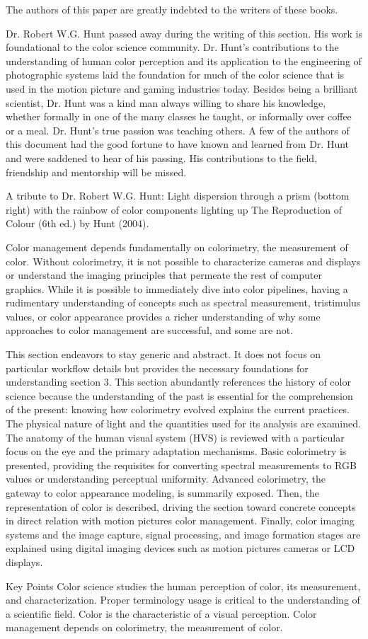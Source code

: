 The authors of this paper are greatly indebted to the writers of these books.

Dr. Robert W.G. Hunt passed away during the writing of this section. His work is foundational to the color science community. Dr. Hunt’s contributions to the understanding of human color perception and its application to the engineering of photographic systems laid the foundation for much of the color science that is used in the motion picture and gaming industries today. Besides being a brilliant scientist, Dr. Hunt was a kind man always willing to share his knowledge, whether formally in one of the many classes he taught, or informally over coffee or a meal. Dr. Hunt’s true passion was teaching others. A few of the authors of this document had the good fortune to have known and learned from Dr. Hunt and were saddened to hear of his passing. His contributions to the field, friendship and mentorship will be missed.

A tribute to Dr. Robert W.G. Hunt: Light dispersion through a prism (bottom right) with the rainbow of color components lighting up The Reproduction of Colour (6th ed.) by Hunt (2004).

Color management depends fundamentally on colorimetry, the measurement of color. Without colorimetry, it is not possible to characterize cameras and displays or understand the imaging principles that permeate the rest of computer graphics. While it is possible to immediately dive into color pipelines, having a rudimentary understanding of concepts such as spectral measurement, tristimulus values, or color appearance provides a richer understanding of why some approaches to color management are successful, and some are not.

This section endeavors to stay generic and abstract. It does not focus on particular workflow details but provides the necessary foundations for understanding section 3. This section abundantly references the history of color science because the understanding of the past is essential for the comprehension of the present: knowing how colorimetry evolved explains the current practices. The physical nature of light and the quantities used for its analysis are examined. The anatomy of the human visual system (HVS) is reviewed with a particular focus on the eye and the primary adaptation mechanisms. Basic colorimetry is presented, providing the requisites for converting spectral measurements to RGB values or understanding perceptual uniformity. Advanced colorimetry, the gateway to color appearance modeling, is summarily exposed. Then, the representation of color is described, driving the section toward concrete concepts in direct relation with motion pictures color management. Finally, color imaging systems and the image capture, signal processing, and image formation stages are explained using digital imaging devices such as motion pictures cameras or LCD displays.

Key Points
Color science studies the human perception of color, its measurement, and characterization.
Proper terminology usage is critical to the understanding of a scientific field.
Color is the characteristic of a visual perception.
Color management depends on colorimetry, the measurement of color.
